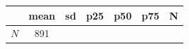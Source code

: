 {
\def\sym#1{\ifmmode^{#1}\else\(^{#1}\)\fi}
\begin{tabular}{l*{1}{cccccc}}
\toprule
            &        mean&          sd&         p25&         p50&         p75&           N\\
\midrule
\midrule
\(N\)       &         891&            &            &            &            &            \\
\bottomrule
\end{tabular}
}
